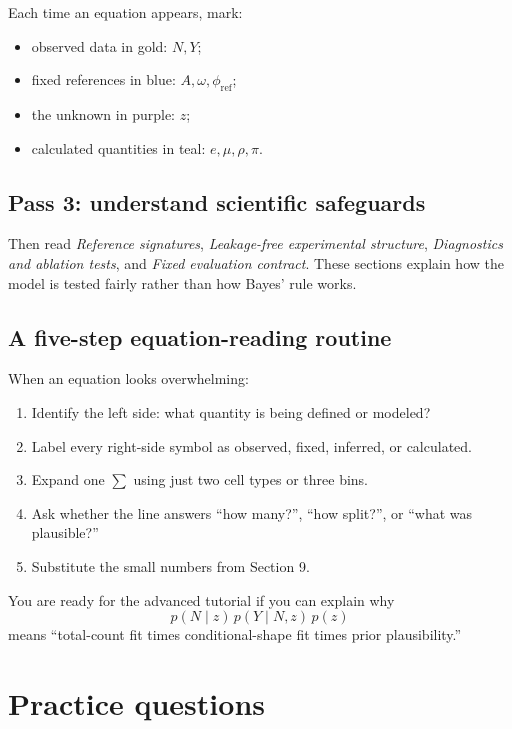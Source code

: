 \documentclass[11pt]{article}
\begin{document}
Each time an equation appears, mark:

\begin{itemize}[leftmargin=2em]
  \item observed data in gold: \(N,Y\);
  \item fixed references in blue: \(A,\omega,\phi_{\mathrm{ref}}\);
  \item the unknown in purple: \(z\);
  \item calculated quantities in teal: \(e,\mu,\rho,\pi\).
\end{itemize}

\subsection{Pass 3: understand scientific safeguards}

Then read \emph{Reference signatures}, \emph{Leakage-free experimental structure},
\emph{Diagnostics and ablation tests}, and \emph{Fixed evaluation contract}.
These sections explain how the model is tested fairly rather than how Bayes' rule
works.

\subsection{A five-step equation-reading routine}

When an equation looks overwhelming:

\begin{enumerate}[leftmargin=2em]
  \item Identify the left side: what quantity is being defined or modeled?
  \item Label every right-side symbol as observed, fixed, inferred, or calculated.
  \item Expand one \(\sum\) using just two cell types or three bins.
  \item Ask whether the line answers “how many?”, “how split?”, or “what was plausible?”
  \item Substitute the small numbers from Section 9.
\end{enumerate}

\begin{checkpoint}
You are ready for the advanced tutorial if you can explain why
\[
p(N\mid z)\,p(Y\mid N,z)\,p(z)
\]
means “total-count fit times conditional-shape fit times prior plausibility.”
\end{checkpoint}

\newpage
\section{Practice questions}
\end{document}

